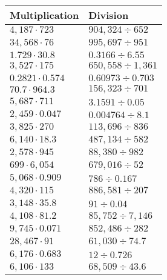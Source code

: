 \begin{longtable}[]{@{}ll@{}}
\toprule
Multiplication & Division\tabularnewline
\midrule
\endhead
\(4,187\cdot723\) & \(904,324÷652\)\tabularnewline
\(34,568\cdot76\) & \(995,697÷951\)\tabularnewline
\(1.729\cdot30.8\) & \(0.3166÷6.55\)\tabularnewline
\(3,527\cdot175\) & \(650,558÷1,361\)\tabularnewline
\(0.2821\cdot0.574\) & \(0.60973÷0.703\)\tabularnewline
\(70.7\cdot964.3\) & \(156,323÷701\)\tabularnewline
\(5,687\cdot711\) & \(3.1591÷0.05\)\tabularnewline
\(2,459\cdot0.047\) & \(0.004764÷8.1\)\tabularnewline
\(3,825\cdot270\) & \(113,696÷836\)\tabularnewline
\(6,140\cdot18.3\) & \(487,134÷582\)\tabularnewline
\(2,578\cdot945\) & \(88,380÷982\)\tabularnewline
\(699\cdot6,054\) & \(679,016÷52\)\tabularnewline
\(5,068\cdot0.909\) & \(786÷0.167\)\tabularnewline
\(4,320\cdot115\) & \(886,581÷207\)\tabularnewline
\(3,148\cdot35.8\) & \(91÷0.04\)\tabularnewline
\(4,108\cdot81.2\) & \(85,752÷7,146\)\tabularnewline
\(9,745\cdot0.071\) & \(852,486÷282\)\tabularnewline
\(28,467\cdot91\) & \(61,030÷74.7\)\tabularnewline
\(6,176\cdot0.683\) & \(12÷0.726\)\tabularnewline
\(6,106\cdot133\) & \(68,509÷43.6\)\tabularnewline
\bottomrule
\end{longtable}
